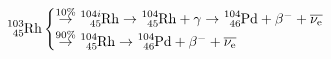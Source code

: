 \begin{equation}
  \ce{^{103}_{45}Rh}
\begin{cases}
   \stackrel{10\%}{\rightarrow} \ce{^{104i}_{45}Rh} \rightarrow \ce{^{104}_{45}Rh} + \gamma \rightarrow \ce{^{104}_{46}Pd} + \beta^- + \overline{\nu_\text{e}}\\
   \stackrel{90\%}{\rightarrow}  \ce{^{104}_{45}Rh} \rightarrow \ce{^{104}_{46}Pd} + \beta^- + \overline{\nu_\text{e}}\\
\end{cases}\label{jabadaba}
\end{equation}
